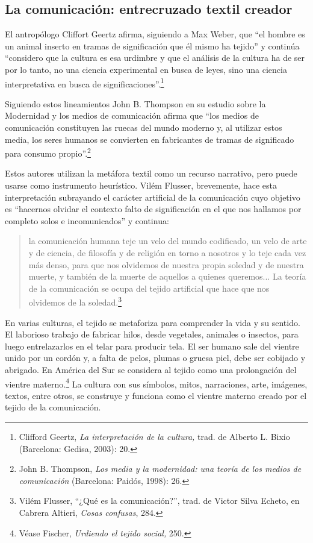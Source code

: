 \documentclass{tufte-handout}
\begin{document}
\hypertarget{la-comunicacin-entrecruzado-textil-creador}{%
\subsection{La comunicación: entrecruzado
textil
creador}\label{la-comunicacin-entrecruzado-textil-creador}}

El antropólogo Cliffort Geertz afirma, siguiendo a Max Weber, que ``el
hombre es un animal inserto en tramas de significación que él mismo ha
tejido'' y continúa ``considero que la cultura es esa urdimbre y que el
análisis de la cultura ha de ser por lo tanto, no una ciencia
experimental en busca de leyes, sino una ciencia interpretativa en busca
de significaciones''.\footnote{Clifford Geertz, \emph{La interpretación
  de la cultura,} trad. de Alberto L. Bixio (Barcelona: Gedisa, 2003):
  20.}

Siguiendo estos lineamientos John B. Thompson en su estudio sobre la
Modernidad y los medios de comunicación afirma que ``los medios de
comunicación constituyen las ruecas del mundo moderno y, al utilizar
estos media, los seres humanos se convierten en fabricantes de tramas de
significado para consumo propio''.\footnote{John B. Thompson, \emph{Los
  media y la modernidad: una teoría de los medios de comunicación}
  (Barcelona: Paidós, 1998): 26.}

Estos autores utilizan la metáfora textil como un recurso narrativo,
pero puede usarse como instrumento heurístico. Vilém Flusser,
brevemente, hace esta interpretación subrayando el carácter artificial
de la comunicación cuyo objetivo es ``hacernos olvidar el contexto falto
de significación en el que nos hallamos por completo solos e
incomunicados'' y continua:

\begin{quote}
la comunicación humana teje un velo del mundo codificado, un velo de
arte y de ciencia, de filosofía y de religión en torno a nosotros y lo
teje cada vez más denso, para que nos olvidemos de nuestra propia
soledad y de nuestra muerte, y también de la muerte de aquellos a
quienes queremos... La teoría de la comunicación se ocupa del tejido
artificial que hace que nos olvidemos de la soledad.\footnote{Vilém
  Flusser, ``¿Qué es la comunicación?'', trad. de Victor Silva Echeto,
  en Cabrera Altieri, \emph{Cosas confusas}, 284.}
\end{quote}

En varias culturas, el tejido se metaforiza para comprender la vida y su
sentido. El laborioso trabajo de fabricar hilos, desde vegetales,
animales o insectos, para luego entrelazarlos en el telar para producir
tela. El ser humano sale del vientre unido por un cordón y, a falta de
pelos, plumas o gruesa piel, debe ser cobijado y abrigado. En América
del Sur se considera al tejido como una prolongación del vientre
materno.\footnote{Véase Fischer, \emph{Urdiendo el tejido social,} 250.}
La cultura con sus símbolos, mitos, narraciones, arte, imágenes, textos,
entre otros, se construye y funciona como el vientre materno creado por
el tejido de la comunicación.
\end{document}
